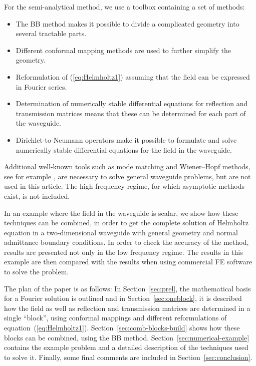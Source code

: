 \documentclass[numreferences]{kluwer}
\begin{document}
For the semi-analytical method, we use a toolbox containing a set of
methods:
\begin{itemize}
\item The BB method makes it possible to divide a complicated geometry
  into several tractable parts.
\item Different conformal mapping methods are used to further simplify
  the geometry.
\item Reformulation of (\ref{eq:Helmholtz1}) assuming that the field
  can be expressed in Fourier series.
\item Determination of numerically stable differential equations for
  reflection and transmission matrices means that these can be
  determined for each part of the waveguide.
\item Dirichlet-to-Neumann operators make it possible to formulate and
  solve numerically stable differential equations for the field in the
  waveguide.
\end{itemize}

Additional well-known tools such as mode matching and Wiener--Hopf
methods, see for example \cite{jones1986}, are necessary to solve
general waveguide problems, but are not used in this article. The high frequency regime, for which asymptotic methods exist, is not included.


In an example where the field in the waveguide is scalar, we show how
these techniques can be combined, in order to get the complete
solution of Helmholtz equation in a two-dimensional waveguide with general geometry and normal admittance boundary conditions. In order to check the accuracy of the method, results are presented not only in the low frequency regime.  The results in
this example are then compared with the results when using commercial
FE software to solve the problem.

The plan of the paper is as follows: In Section~\ref{sec:prel}, the
mathematical basis for a Fourier solution is outlined and in
Section~\ref{sec:oneblock}, it is described how the field as well as
reflection and transmission matrices are determined in a single
``block'', using conformal mappings and different reformulations of
equation~(\ref{eq:Helmholtz1}).  Section~\ref{sec:comb-blocks-build}
shows how these blocks can be combined, using the BB
method. Section~\ref{sec:numerical-example} contains the example
problem and a detailed description of the techniques used to solve
it. Finally, some final comments are included in
Section~\ref{sec:conclusion}.
\end{document}
